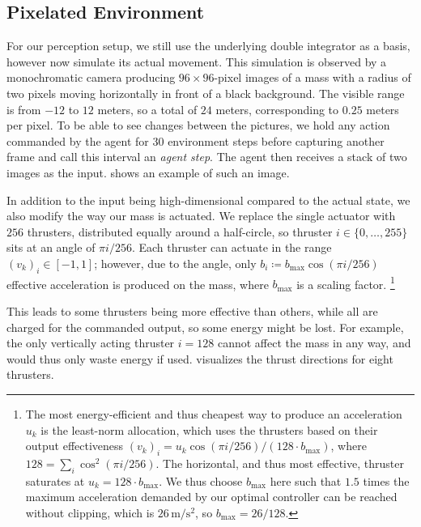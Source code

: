 \subsection{Pixelated Environment}
\label{subsec:pixelated-environment}

For our perception setup, we still use the underlying double integrator as a basis, however now
simulate its actual movement. This simulation is observed by a monochromatic camera producing $96 \times 96$-pixel
images of a mass with a radius of two pixels moving horizontally in front of a black background. The visible range
is from $-12$ to $12$ meters, so a total of $24$ meters, corresponding to $0.25$ meters per pixel. To be able to see
changes between the pictures, we hold any action commanded by the agent for $30$ environment steps before
capturing another frame and call this interval an \emph{agent step}.
The agent then receives a stack of two images as the input.  shows
an example of such an image.

In addition to the input being high-dimensional compared to the actual state, we also modify the way
our mass is actuated. We replace the single actuator with $256$ thrusters, distributed equally around
a half-circle, so thruster $i \in \{0, \dots, 255\}$ sits at an angle of $\pi i / 256$. Each thruster can actuate in the
range $(v_k)_i \in [-1, 1]$; however, due to the angle, only $b_i \coloneqq b_{\max} \cos(\pi i / 256)$ effective acceleration is produced on
the mass, where $b_{\max}$ is a scaling factor.%
\footnote{The most energy-efficient and thus cheapest way to produce an acceleration $u_k$ is the least-norm allocation, which
uses the thrusters based on their output effectiveness $(v_k)_i = u_k \cos(\pi i / 256)/(128 \cdot b_{\max})$, where $128 = \sum_i \cos^2(\pi i / 256)$.
The horizontal, and thus most effective, thruster saturates at $u_k = 128 \cdot b_{\max}$. We thus choose $b_{\max}$ here such that $1.5$ times the maximum acceleration demanded
by our optimal controller can be reached without clipping, which is $26\,\mathrm{m/s^2}$, so $b_{\max} = 26/128$.}

This leads to some thrusters being more effective than others, while all are charged for the commanded output,
so some energy might be lost. For example, the only vertically acting thruster $i = 128$ cannot
affect the mass in any way, and would thus only waste energy if used. 
visualizes the thrust directions for eight thrusters.

